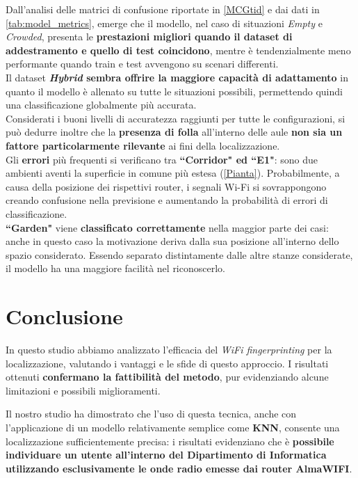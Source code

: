 \documentclass{article}
\begin{document}
Dall'analisi delle matrici di confusione riportate in \autoref{MCGtid} e dai dati in \autoref{tab:model_metrics}, emerge che il modello, nel caso di situazioni \textit{Empty} e \textit{Crowded}, presenta le \textbf{prestazioni migliori quando il dataset di addestramento e quello di test coincidono}, mentre è tendenzialmente meno performante quando train e test avvengono su scenari differenti.\\
Il dataset \textbf{\textit{Hybrid} sembra offrire la maggiore capacità di adattamento} in quanto il modello è allenato su tutte le situazioni possibili, permettendo quindi una classificazione globalmente più accurata. \\

Considerati i buoni livelli di accuratezza raggiunti per tutte le configurazioni, si può dedurre inoltre che la \textbf{presenza di folla} all'interno delle aule \textbf{non sia un fattore particolarmente rilevante} ai fini della localizzazione.\\

Gli \textbf{errori} più frequenti si verificano tra \textbf{``Corridor" ed ``E1"}: sono due ambienti aventi la superficie in comune più estesa (\autoref{Pianta}). Probabilmente, a causa della posizione dei rispettivi router, i segnali Wi-Fi si sovrappongono creando confusione nella previsione e aumentando la probabilità di errori di classificazione.\\
\textbf{``Garden"} viene \textbf{classificato correttamente} nella maggior parte dei casi: anche in questo caso la motivazione deriva dalla sua posizione all'interno dello spazio considerato. Essendo separato distintamente dalle altre stanze considerate, il modello ha una maggiore facilità nel riconoscerlo.

\section{Conclusione}
In questo studio abbiamo analizzato l'efficacia del \textit{WiFi fingerprinting} per la localizzazione, valutando i vantaggi e le sfide di questo approccio. I risultati ottenuti \textbf{confermano la fattibilità del metodo}, pur evidenziando alcune limitazioni e possibili miglioramenti.

Il nostro studio ha dimostrato che l'uso di questa tecnica, anche con l'applicazione di un modello relativamente semplice come \textbf{KNN}, consente una localizzazione sufficientemente precisa: i risultati evidenziano che è \textbf{possibile individuare un utente all'interno del Dipartimento di Informatica utilizzando esclusivamente le onde radio emesse dai router AlmaWIFI}.
\end{document}

